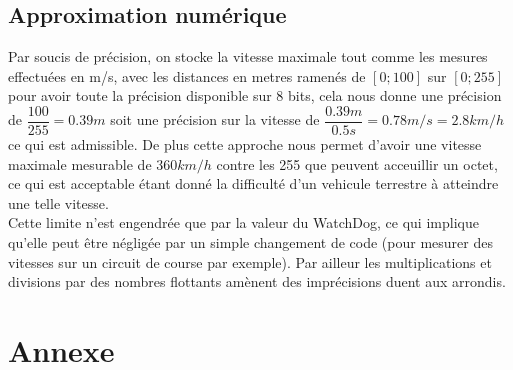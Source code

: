\documentclass[a4paper, 12pt]{article}
\begin{document}
		\subsection{Approximation numérique}
		Par soucis de précision, on stocke la vitesse maximale tout comme les mesures effectuées en m/s, avec les distances en metres ramenés de $[0;100]$ sur $[0;255]$ pour avoir toute la précision disponible sur 8 bits, cela nous donne une précision de $\dfrac{100}{255} = 0.39m$ soit une précision sur la vitesse de $\dfrac{0.39m}{0.5s} = 0.78m/s = 2.8 km/h$ ce qui est admissible. De plus cette approche nous permet d'avoir une vitesse maximale mesurable de $360km/h$ contre les 255 que peuvent acceuillir un octet, ce qui est acceptable étant donné la difficulté d'un vehicule terrestre à atteindre une telle vitesse.\\
		Cette limite n'est engendrée que par la valeur du WatchDog, ce qui implique qu'elle peut être négligée par un simple changement de code (pour mesurer des vitesses sur un circuit de course par exemple).
 		Par ailleur les multiplications et divisions par des nombres flottants amènent des imprécisions duent aux arrondis.
		
		\newpage
		\section{Annexe}
\end{document}
